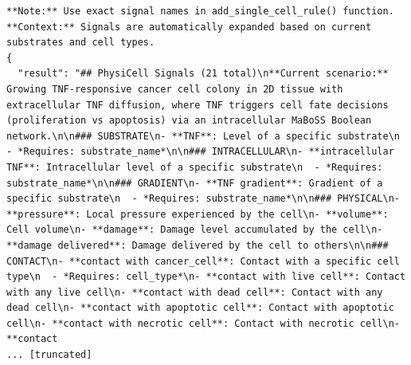 \documentclass[11pt,a4paper]{article}
\begin{document}
\begin{toolokbox}
\begin{lstlisting}
**Note:** Use exact signal names in add_single_cell_rule() function.
**Context:** Signals are automatically expanded based on current substrates and cell types.
{
  "result": "## PhysiCell Signals (21 total)\n**Current scenario:** Growing TNF-responsive cancer cell colony in 2D tissue with extracellular TNF diffusion, where TNF triggers cell fate decisions (proliferation vs apoptosis) via an intracellular MaBoSS Boolean network.\n\n### SUBSTRATE\n- **TNF**: Level of a specific substrate\n  - *Requires: substrate_name*\n\n### INTRACELLULAR\n- **intracellular TNF**: Intracellular level of a specific substrate\n  - *Requires: substrate_name*\n\n### GRADIENT\n- **TNF gradient**: Gradient of a specific substrate\n  - *Requires: substrate_name*\n\n### PHYSICAL\n- **pressure**: Local pressure experienced by the cell\n- **volume**: Cell volume\n- **damage**: Damage level accumulated by the cell\n- **damage delivered**: Damage delivered by the cell to others\n\n### CONTACT\n- **contact with cancer_cell**: Contact with a specific cell type\n  - *Requires: cell_type*\n- **contact with live cell**: Contact with any live cell\n- **contact with dead cell**: Contact with any dead cell\n- **contact with apoptotic cell**: Contact with apoptotic cell\n- **contact with necrotic cell**: Contact with necrotic cell\n- **contact 
... [truncated]
\end{lstlisting}
\end{toolokbox}
\end{document}
